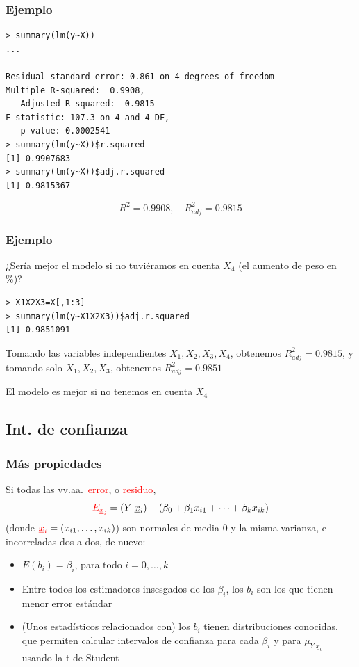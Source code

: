 \documentclass[12pt,t]{beamer}
\newcommand{\red}[1]{\textcolor{red}{#1}}
\theoremstyle{plain}
\theoremstyle{definition}
\begin{document}
\begin{frame}[fragile]
\frametitle{Ejemplo}
\begin{lstlisting}
> summary(lm(y~X))
...

Residual standard error: 0.861 on 4 degrees of freedom
Multiple R-squared:  0.9908,	
   Adjusted R-squared:  0.9815 
F-statistic: 107.3 on 4 and 4 DF,  
   p-value: 0.0002541
> summary(lm(y~X))$r.squared
[1] 0.9907683
> summary(lm(y~X))$adj.r.squared
[1] 0.9815367
\end{lstlisting}
$$
R^2=0.9908,\quad 
R^2_{adj}=0.9815
$$
\end{frame}

\begin{frame}[fragile]
\frametitle{Ejemplo}
¿Sería mejor el modelo si no tuviéramos en cuenta $X_4$  (el aumento de peso en \%)?\medskip

\begin{lstlisting}
> X1X2X3=X[,1:3]
> summary(lm(y~X1X2X3))$adj.r.squared
[1] 0.9851091
\end{lstlisting}
Tomando las variables independientes $X_1,X_2,X_3,X_4$, obtenemos $R^2_{adj}=0.9815$, y tomando solo $X_1,X_2,X_3$,
obtenemos $R^2_{adj}=0.9851$\medskip

El modelo es mejor si no tenemos en cuenta $X_4$
\end{frame}



\subsection{Int. de confianza}
\begin{frame}
\frametitle{Más propiedades}

Si todas las vv.aa.\ \red{error}, o \red{residuo},
$$
\red{E_{\underline{x}_i}}=(Y|\underline{x}_i)-(\beta_0+\beta_1 x_{i1}+\cdots+\beta_k x_{ik})
$$
(donde $\red{\underline{x}_i}=(x_{i1},\ldots,x_{ik})$)
son normales de media 0 y la misma varianza, e incorreladas dos a dos, de nuevo:\medskip

\begin{itemize}
\item $E(b_i)=\beta_i$, para todo $i=0,\ldots,k$\medskip

\item Entre todos los estimadores insesgados de los $\beta_i$, los $b_i$ son los que tienen menor error estándar\medskip

\item (Unos estadísticos relacionados con) los $b_i$ tienen distribuciones conocidas, que permiten calcular intervalos de confianza para cada $\beta_i$ y para $\mu_{Y|\underline{x}_0}$ usando la t de Student
\end{itemize}

\end{frame}
\end{document}
